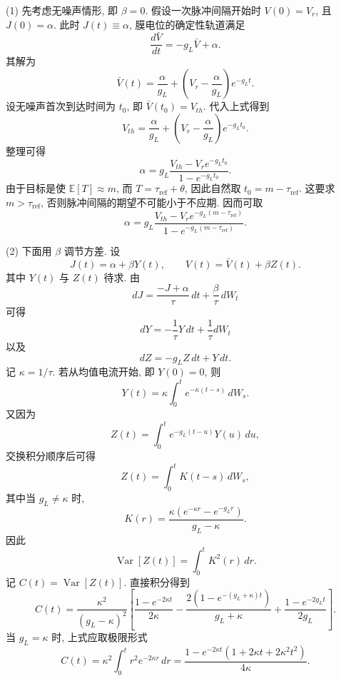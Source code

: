 ﻿\documentclass[UTF8,  zihao=-4]{ctexart}
\begin{document}
(1) 先考虑无噪声情形,  即 \(\beta=0\). 假设一次脉冲间隔开始时 \(V(0)=V_r\),  且 \(J(0)=\alpha\). 此时 \(J(t)\equiv \alpha\),  膜电位的确定性轨道满足
\[
    \frac{d\bar V}{dt}=-g_L\bar V+\alpha.
\]
其解为
\[
    \bar V(t)=\frac{\alpha}{g_L}
    +\left(V_r-\frac{\alpha}{g_L}\right)e^{-g_Lt}.
\]
设无噪声首次到达时间为 \(t_0\),  即 \(\bar V(t_0)=V_{th}\). 代入上式得到
\[
    V_{th}
    =
    \frac{\alpha}{g_L}
    +
    \left(V_r-\frac{\alpha}{g_L}\right)e^{-g_Lt_0}.
\]
整理可得
\[
    \alpha
    =
    g_L
    \frac{V_{th}-V_re^{-g_Lt_0}}
    {1-e^{-g_Lt_0}}.
\]
由于目标是使 \(\mathbb E[T]\approx m\),  而 \(T=\tau_{\mathrm{ref}}+\theta\),  因此自然取
$
    t_0=m-\tau_{\mathrm{ref}}.
$
这要求 \(m>\tau_{\mathrm{ref}}\),  否则脉冲间隔的期望不可能小于不应期. 因而可取
\[
    \alpha
    =
    g_L
    \frac{V_{th}-V_re^{-g_L(m-\tau_{\mathrm{ref}})}}
    {1-e^{-g_L(m-\tau_{\mathrm{ref}})}}.
\]

(2) 下面用 \(\beta\) 调节方差. 设
\[
    J(t)=\alpha+\beta Y(t), \qquad
    V(t)=\bar V(t)+\beta Z(t).
\]
其中 \(Y(t)\) 与 \(Z(t)\) 待求. 由
\[
    dJ=\frac{-J+\alpha}{\tau}\,  dt+\frac{\beta}{\tau}\,  dW_t
\]
可得
\[
    dY=-\frac{1}{\tau}Y\,  dt+\frac{1}{\tau}dW_t
\]
以及
\[
    dZ=-g_LZ\,  dt+Y\,  dt.
\]
记 \(\kappa=1/\tau\). 若从均值电流开始,  即 \(Y(0)=0\),  则
\[
    Y(t)=\kappa\int_0^t e^{-\kappa(t-s)}\,  dW_s.
\]
又因为
\[
    Z(t)=\int_0^t e^{-g_L(t-u)}Y(u)\,  du, 
\]
交换积分顺序后可得
\[
    Z(t)=\int_0^t K(t-s)\,  dW_s, 
\]
其中当 \(g_L\neq \kappa\) 时, 
\[
    K(r)=
    \frac{\kappa\left(e^{-\kappa r}-e^{-g_L r}\right)}
    {g_L-\kappa}.
\]
因此
\[
    \operatorname{Var}[Z(t)]
    =
    \int_0^t K^2(r)\,  dr.
\]
记 \(C(t)=\operatorname{Var}[Z(t)]\). 直接积分得到
\[
    C(t)
    =
    \frac{\kappa^2}{(g_L-\kappa)^2}
    \left[
    \frac{1-e^{-2\kappa t}}{2\kappa}
    -
    \frac{2\left(1-e^{-(g_L+\kappa)t}\right)}{g_L+\kappa}
    +
    \frac{1-e^{-2g_Lt}}{2g_L}
    \right].
\]
当 \(g_L=\kappa\) 时,  上式应取极限形式
\[
    C(t)
    =
    \kappa^2\int_0^t r^2e^{-2\kappa r}\,  dr
    =
    \frac{
    1-e^{-2\kappa t}
    \left(1+2\kappa t+2\kappa^2t^2\right)
    }
    {4\kappa}.
\]
\end{document}
